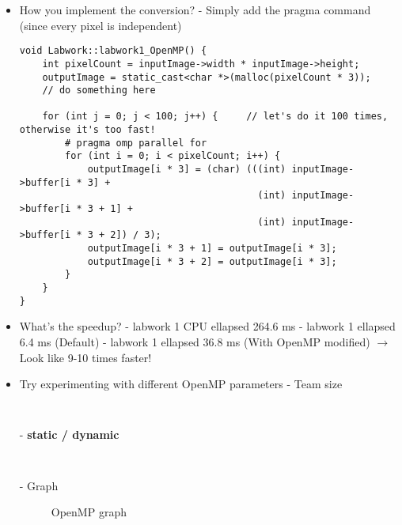 \documentclass[10pt, a4paper]{article}
\begin{document}
\begin{itemize}
    \item How you implement the conversion? 
    \newline
    - Simply add the pragma command (since every pixel is independent)
    
    \begin{verbatim}
void Labwork::labwork1_OpenMP() {
    int pixelCount = inputImage->width * inputImage->height;
    outputImage = static_cast<char *>(malloc(pixelCount * 3));
    // do something here

    for (int j = 0; j < 100; j++) {     // let's do it 100 times, otherwise it's too fast!
        # pragma omp parallel for
        for (int i = 0; i < pixelCount; i++) {
            outputImage[i * 3] = (char) (((int) inputImage->buffer[i * 3] +
                                          (int) inputImage->buffer[i * 3 + 1] +
                                          (int) inputImage->buffer[i * 3 + 2]) / 3);
            outputImage[i * 3 + 1] = outputImage[i * 3];
            outputImage[i * 3 + 2] = outputImage[i * 3];
        }
    }
}
    \end{verbatim}
    
    \item What's the speedup? 
	\newline
	- labwork 1 CPU ellapsed 264.6 ms
	\newline
	- labwork 1 ellapsed 6.4 ms (Default)
	\newline
	- labwork 1 ellapsed 36.8 ms (With OpenMP modified) 
	\newline
	$\rightarrow$ Look like 9-10 times faster!
    
    \item Try experimenting with different OpenMP parameters
    \newline
    - Team size

    \begin{verbatim}
        
    \end{verbatim}
    
    - \textbf{static / dynamic}

    \begin{verbatim}
        
    \end{verbatim}

    - Graph 
    \begin{figure}[H]
        \centering
        \begin{tikzpicture}

        \end{tikzpicture}
        \caption{OpenMP graph}
        \label{fig:openmp-comparison}
    \end{figure}
    
\end{itemize}
\end{document}
